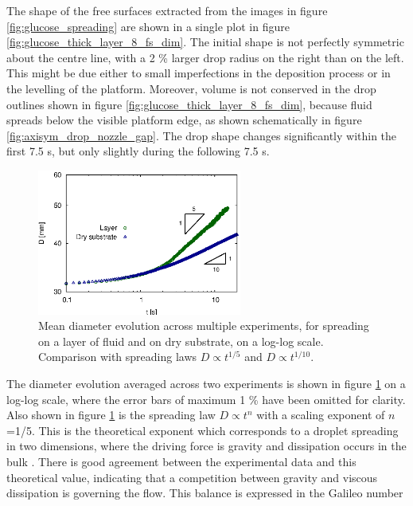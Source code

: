 \documentclass[aip,graphicx]{revtex4-1}
\begin{document}
The shape of the free surfaces extracted from the images in figure \ref{fig:glucose_spreading} are shown in a single plot in figure \ref{fig:glucose_thick_layer_8_fs_dim}. 
The initial shape is not perfectly symmetric about the centre line, with a 2 \% larger drop radius on the right than on the left. 
This might be due either to small imperfections in the deposition process or in the levelling of the platform.
Moreover, volume is not conserved in the drop outlines shown in figure \ref{fig:glucose_thick_layer_8_fs_dim}, because fluid spreads below the visible platform edge, as shown schematically in figure \ref{fig:axisym_drop_nozzle_gap}.
The drop shape changes significantly within the first 7.5 s, but only slightly during the following 7.5 s.

\begin{figure}[!ht]
\centering
\includegraphics[width=0.6\textwidth]{figures/diam_vs_time_comp_layer_dry.eps}
\caption{Mean diameter evolution across multiple experiments, for spreading on a layer of fluid and on dry substrate, on a log-log scale. Comparison with spreading laws $D \propto t^{1/5}$ and $D \propto t^{1/10}$.}
\label{fig:diam_vs_time_comp_layer_dry}
\end{figure}

The diameter evolution averaged across two experiments is shown in figure \ref{fig:diam_vs_time_comp_layer_dry} on a log-log scale, where the error bars of maximum 1 \% have been omitted for clarity.
Also shown in figure \ref{fig:diam_vs_time_comp_layer_dry} is the spreading law $D \propto t^n$ with a scaling exponent of $n$=1/5. 
This is the theoretical exponent which corresponds to a droplet spreading in two dimensions, where the driving force is gravity and dissipation occurs in the bulk \cite{bonn2009wetting}.
There is good agreement between the experimental data and this theoretical value, indicating that a competition between gravity and viscous dissipation is governing the flow. 
This balance is expressed in the Galileo number
\end{document}

